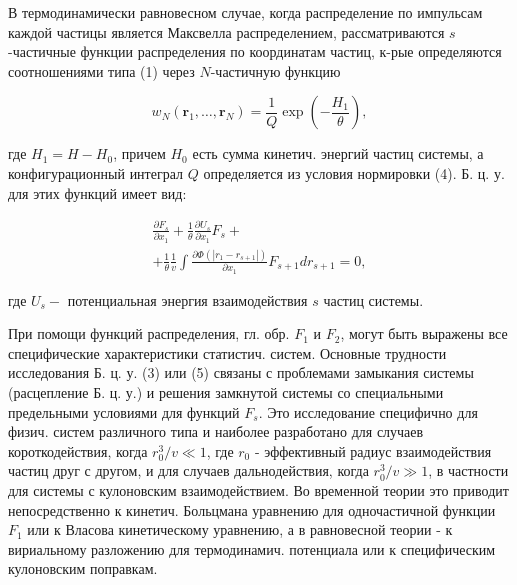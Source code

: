 \documentclass[10pt]{article}
\begin{document}
В термодинамически равновесном случае, когда распределение по импульсам каждой частицы является Максвелла распределением, рассматриваются $s$-частичные функции распределения по координатам частиц, к-рые определяются соотношениями типа (1) через $N$-частичную функцию



\[

w_{N}\left(\boldsymbol{r}_{1}, \ldots, \boldsymbol{r}_{N}\right)=\frac{1}{Q} \exp \left(-\frac{H_{1}}{\theta}\right),

\]



где $H_{1}=H-H_{0}$, причем $H_{0}$ есть сумма кинетич. энергий частиц системы, а конфигурационный интеграл $Q$ определяется из условия нормировки (4). Б. ц. у. для этих функций имеет вид:



\[

\begin{gathered}

\frac{\partial F_{s}}{\partial x_{1}}+\frac{1}{\theta} \frac{\partial U_{s}}{\partial x_{1}} F_{s}+ \\

+\frac{1}{\theta} \frac{1}{v} \int \frac{\partial \Phi\left(\left|r_{1}-r_{s+1}\right|\right)}{\partial x_{1}} F_{s+1} d r_{s+1}=0,

\end{gathered}

\]



где $U_{s}-$ потенциальная энергия взаимодействия $s$ частиц системы.



При помощи функций распределения, гл. обр. $F_{1}$ и $F_{2}$, могут быть выражены все специфические характеристики статистич. систем. Основные трудности исследования Б. ц. у. (3) или (5) связаны с проблемами замыкания системы (расцепление Б. ц. у.) и решения замкнутой системы со специальными предельными условиями для функций $F_{s}$. Это исследование специфично для физич. систем различного типа и наиболее разработано для случаев короткодействия, когда $r_{0}^{3} / v \ll 1$, где $r_{0}$ - эффективный радиус взаимодействия частиц друг с другом, и для случаев дальнодействия, когда $r_{0}^{3} / v \gg 1$, в частности для системы с кулоновским взаимодействием. Во временной теории это приводит непосредственно к кинетич. Больцмана уравнению для одночастичной функции $F_{1}$ или к Власова кинетическому уравнению, а в равновесной теории - к вириальному разложению для термодинамич. потенциала или к специфическим кулоновским поправкам.
\end{document}
